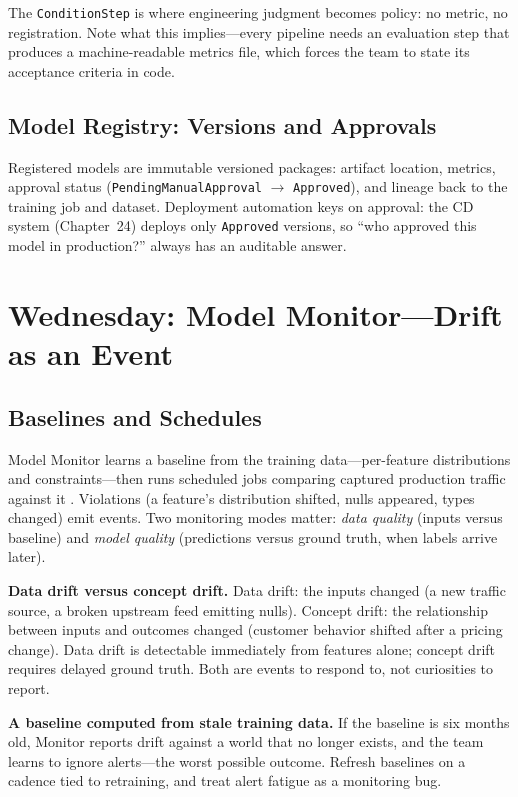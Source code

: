 The \texttt{ConditionStep} is where engineering judgment becomes policy: no metric, no registration. Note what this implies---every pipeline needs an evaluation step that produces a machine-readable metrics file, which forces the team to state its acceptance criteria in code.

\subsection{Model Registry: Versions and Approvals}
Registered models are immutable versioned packages: artifact location, metrics, approval status (\texttt{PendingManualApproval} $\rightarrow$ \texttt{Approved}), and lineage back to the training job and dataset. Deployment automation keys on approval: the CD system (Chapter~24) deploys only \texttt{Approved} versions, so ``who approved this model in production?'' always has an auditable answer.

\section{Wednesday: Model Monitor---Drift as an Event}
\subsection{Baselines and Schedules}
Model Monitor learns a baseline from the training data---per-feature distributions and constraints---then runs scheduled jobs comparing captured production traffic against it \cite{awsModelMonitorDocs}. Violations (a feature's distribution shifted, nulls appeared, types changed) emit events. Two monitoring modes matter: \emph{data quality} (inputs versus baseline) and \emph{model quality} (predictions versus ground truth, when labels arrive later).

\textbf{Data drift versus concept drift.} Data drift: the inputs changed (a new traffic source, a broken upstream feed emitting nulls). Concept drift: the relationship between inputs and outcomes changed (customer behavior shifted after a pricing change). Data drift is detectable immediately from features alone; concept drift requires delayed ground truth. Both are events to respond to, not curiosities to report.

\begin{pitfall}
\textbf{A baseline computed from stale training data.} If the baseline is six months old, Monitor reports drift against a world that no longer exists, and the team learns to ignore alerts---the worst possible outcome. Refresh baselines on a cadence tied to retraining, and treat alert fatigue as a monitoring bug.
\end{pitfall}

